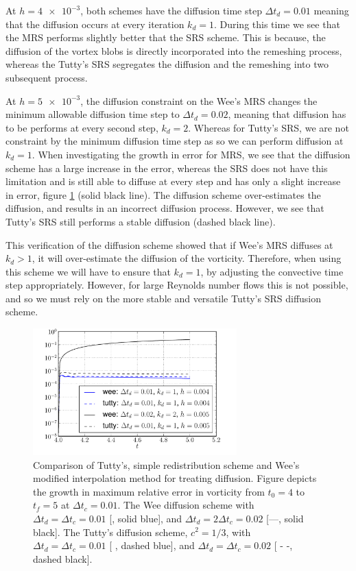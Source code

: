 At $h = \num{4e-3}$, both schemes have the diffusion time step $\Delta t_d = 0.01$ meaning that the diffusion occurs at every iteration $k_d = 1$. During this time we see that the MRS performs slightly better that the SRS scheme. This is because, the diffusion of the vortex blobs is directly incorporated into the remeshing process, whereas the Tutty's SRS segregates the diffusion and the remeshing into two subsequent process. 

At $h = \num{5e-3}$, the diffusion constraint on the Wee's MRS changes the minimum allowable diffusion time step to $\Delta t_d = 0.02$, meaning that diffusion has to be performs at every second step, $k_d=2$. Whereas for Tutty's SRS, we are not constraint by the minimum diffusion time step as so we can perform diffusion at $k_d = 1$. When investigating the growth in error for MRS, we see that the diffusion scheme has a large increase in the error, whereas the SRS does not have this limitation and is still able to diffuse at every step and has only a slight increase in error, figure \ref{fig:lambOseen_diffusionMethod_comparison_compressed} (solid black line). The diffusion scheme over-estimates the diffusion, and results in an incorrect diffusion process. However, we see that Tutty's SRS still performs a stable diffusion (dashed black line).

This verification of the diffusion scheme showed that if Wee's MRS diffuses at $k_d > 1$, it will over-estimate the diffusion of the vorticity. Therefore, when using this scheme we will have to ensure that $k_d = 1$, by adjusting the convective time step appropriately. However, for large Reynolds number flows this is not possible, and so we must rely on the more stable and versatile Tutty's SRS diffusion scheme.

	\begin{figure}[!t]
	\centering
	\includegraphics[width=0.7\textwidth]{figures/lagrangian/lambOseen_diffusionMethod_comparison_compressed.pdf}
	\caption{Comparison of Tutty's, simple redistribution scheme and Wee's modified interpolation method for treating diffusion. Figure depicts the growth in maximum relative error in vorticity from $t_0=4$ to $t_f=5$ at $\Delta t_c = 0.01$. The Wee diffusion scheme with $\Delta t_d = \Delta t_c = 0.01$ [{\color{plotBlue}{---}}, solid blue], and $\Delta t_d = 2 \Delta t_c = 0.02$ [---, solid black]. The Tutty's diffusion scheme, $c^2 = 1/3$, with $\Delta t_d = \Delta t_c = 0.01$ [ {\color{plotBlue}{- -}}, dashed blue], and $\Delta t_d = \Delta t_c = 0.02$ [ - -, dashed black].}
	\label{fig:lambOseen_diffusionMethod_comparison_compressed}
	\end{figure}

